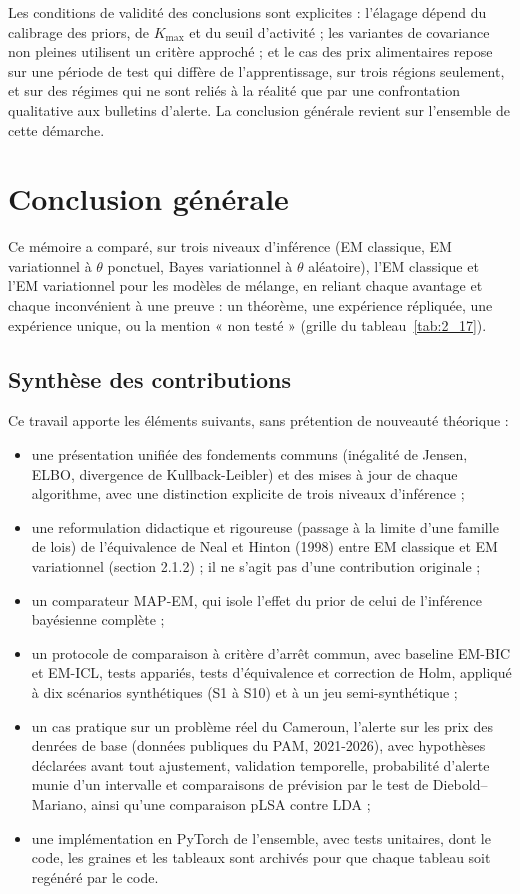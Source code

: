 Les conditions de validité des conclusions sont explicites : l'élagage dépend du calibrage des priors, de $K_{\max}$ et du seuil d'activité ; les variantes de covariance non pleines utilisent un critère approché ; et le cas des prix alimentaires repose sur une période de test qui diffère de l'apprentissage, sur trois régions seulement, et sur des régimes qui ne sont reliés à la réalité que par une confrontation qualitative aux bulletins d'alerte. La conclusion générale revient sur l'ensemble de cette démarche.


\chapter*{Conclusion générale}
Ce mémoire a comparé, sur trois niveaux d'inférence (EM classique, EM variationnel à $\theta$ ponctuel, Bayes variationnel à $\theta$ aléatoire), l'EM classique et l'EM variationnel pour les modèles de mélange, en reliant chaque avantage et chaque inconvénient à une preuve : un théorème, une expérience répliquée, une expérience unique, ou la mention « non testé » (grille du tableau~\ref{tab:2_17}).

\section*{Synthèse des contributions}
Ce travail apporte les éléments suivants, sans prétention de nouveauté théorique :

\begin{itemize}
\item une présentation unifiée des fondements communs (inégalité de Jensen, ELBO, divergence de Kullback-Leibler) et des mises à jour de chaque algorithme, avec une distinction explicite de trois niveaux d'inférence ;
\item une reformulation didactique et rigoureuse (passage à la limite d'une famille de lois) de l'équivalence de Neal et Hinton (1998) entre EM classique et EM variationnel (section 2.1.2) ; il ne s'agit pas d'une contribution originale ;
\item un comparateur MAP-EM, qui isole l'effet du prior de celui de l'inférence bayésienne complète ;
\item un protocole de comparaison à critère d'arrêt commun, avec baseline EM-BIC et EM-ICL, tests appariés, tests d'équivalence et correction de Holm, appliqué à dix scénarios synthétiques (S1 à S10) et à un jeu semi-synthétique ;
\item un cas pratique sur un problème réel du Cameroun, l'alerte sur les prix des denrées de base (données publiques du PAM, 2021-2026), avec hypothèses déclarées avant tout ajustement, validation temporelle, probabilité d'alerte munie d'un intervalle et comparaisons de prévision par le test de Diebold--Mariano, ainsi qu'une comparaison pLSA contre LDA ;
\item une implémentation en PyTorch de l'ensemble, avec tests unitaires, dont le code, les graines et les tableaux sont archivés pour que chaque tableau soit regénéré par le code.
\end{itemize}

